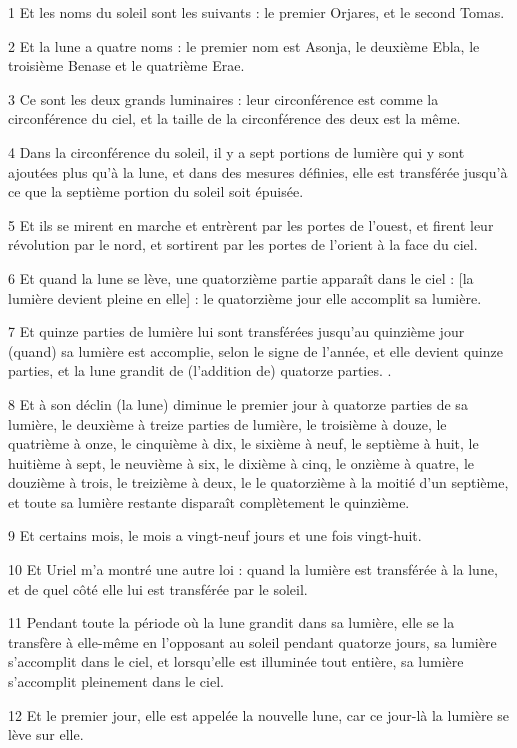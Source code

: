 \par 1 Et les noms du soleil sont les suivants : le premier Orjares, et le second Tomas.
\par 2 Et la lune a quatre noms : le premier nom est Asonja, le deuxième Ebla, le troisième Benase et le quatrième Erae.
\par 3 Ce sont les deux grands luminaires : leur circonférence est comme la circonférence du ciel, et la taille de la circonférence des deux est la même.
\par 4 Dans la circonférence du soleil, il y a sept portions de lumière qui y sont ajoutées plus qu'à la lune, et dans des mesures définies, elle est transférée jusqu'à ce que la septième portion du soleil soit épuisée.
\par 5 Et ils se mirent en marche et entrèrent par les portes de l'ouest, et firent leur révolution par le nord, et sortirent par les portes de l'orient à la face du ciel.
\par 6 Et quand la lune se lève, une quatorzième partie apparaît dans le ciel : [la lumière devient pleine en elle] : le quatorzième jour elle accomplit sa lumière.
\par 7 Et quinze parties de lumière lui sont transférées jusqu'au quinzième jour (quand) sa lumière est accomplie, selon le signe de l'année, et elle devient quinze parties, et la lune grandit de (l'addition de) quatorze parties. .
\par 8 Et à son déclin (la lune) diminue le premier jour à quatorze parties de sa lumière, le deuxième à treize parties de lumière, le troisième à douze, le quatrième à onze, le cinquième à dix, le sixième à neuf, le septième à huit, le huitième à sept, le neuvième à six, le dixième à cinq, le onzième à quatre, le douzième à trois, le treizième à deux, le le quatorzième à la moitié d'un septième, et toute sa lumière restante disparaît complètement le quinzième.
\par 9 Et certains mois, le mois a vingt-neuf jours et une fois vingt-huit.
\par 10 Et Uriel m'a montré une autre loi : quand la lumière est transférée à la lune, et de quel côté elle lui est transférée par le soleil.
\par 11 Pendant toute la période où la lune grandit dans sa lumière, elle se la transfère à elle-même en l'opposant au soleil pendant quatorze jours, sa lumière s'accomplit dans le ciel, et lorsqu'elle est illuminée tout entière, sa lumière s'accomplit pleinement dans le ciel.
\par 12 Et le premier jour, elle est appelée la nouvelle lune, car ce jour-là la lumière se lève sur elle.
